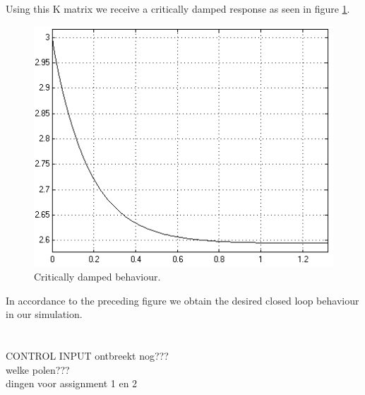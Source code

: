 \documentclass[final]{scrreprt} %
\begin{document}
Using this K matrix we receive a critically damped response as seen in figure \ref{fig:critically}.

\begin{figure}[H]
\centering
\includegraphics[scale = 0.5]{res/critically-res.png}
\caption{Critically damped behaviour.}
\label{fig:critically}
\end{figure}

In accordance to the preceding figure we obtain the desired closed loop behaviour in our simulation.\\\\
\\
CONTROL INPUT ontbreekt nog???\\
welke polen???\\
dingen voor assignment 1 en 2\\
\end{document}
